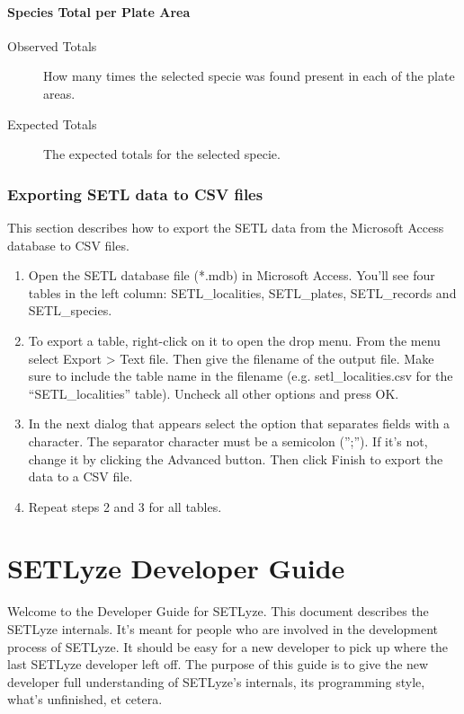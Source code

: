 \documentclass[letterpaper,10pt,english]{sphinxmanual}
\begin{document}
\paragraph{Species Total per Plate Area}
\label{user_manual:species-total-per-plate-area}\begin{description}
\item[{Observed Totals}] \leavevmode
How many times the selected specie was found present in each of
the plate areas.

\item[{Expected Totals}] \leavevmode
The expected totals for the selected specie.

\end{description}


\subsubsection{Exporting SETL data to CSV files}
\label{user_manual:exporting-setl-data-to-csv-files}\label{user_manual:export-csv-msaccess}
This section describes how to export the SETL data from the Microsoft
Access database to CSV files.
\begin{enumerate}
\item {} 
Open the SETL database file (*.mdb) in Microsoft Access. You'll
see four tables in the left column: SETL\_localities, SETL\_plates,
SETL\_records and SETL\_species.

\item {} 
To export a table, right-click on it to open the drop menu. From the
menu select Export \textgreater{} Text file. Then give the filename of the output
file. Make sure to include the table name in the filename (e.g.
setl\_localities.csv for the ``SETL\_localities'' table). Uncheck all
other options and press OK.

\item {} 
In the next dialog that appears select the option that separates
fields with a character. The separator character must be a semicolon
('';''). If it's not, change it by clicking the Advanced button. Then
click Finish to export the data to a CSV file.

\item {} 
Repeat steps 2 and 3 for all tables.

\end{enumerate}


\section{SETLyze Developer Guide}
\label{developer_guide:setlyze-developer-guide}\label{developer_guide::doc}\label{developer_guide:developer-guide}
Welcome to the Developer Guide for SETLyze. This document describes the
SETLyze internals. It’s meant for people who are involved in the
development process of SETLyze. It should be easy for a new developer
to pick up where the last SETLyze developer left off. The purpose of
this guide is to give the new developer full understanding of SETLyze's
internals, its programming style, what's unfinished, et cetera.
\end{document}

